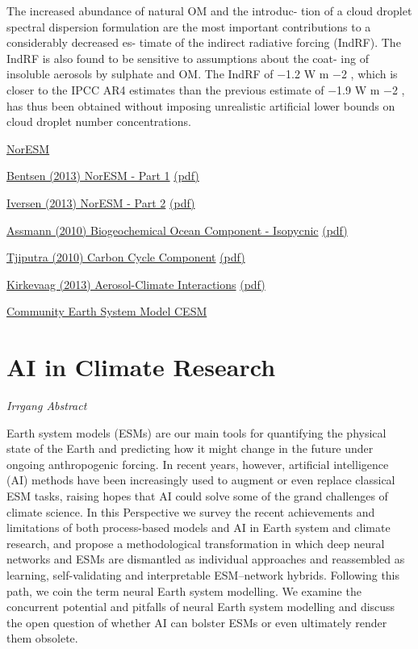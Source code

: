 \documentclass[
]{book}
\begin{document}
The increased abundance of natural OM and the introduc-
tion of a cloud droplet spectral dispersion formulation are the
most important contributions to a considerably decreased es-
timate of the indirect radiative forcing (IndRF). The IndRF
is also found to be sensitive to assumptions about the coat-
ing of insoluble aerosols by sulphate and OM. The IndRF of
−1.2 W m −2 , which is closer to the IPCC AR4 estimates than
the previous estimate of −1.9 W m −2 , has thus been obtained
without imposing unrealistic artificial lower bounds on cloud
droplet number concentrations.

\href{https://www.noresm.org/}{NorESM}

\href{https://gmd.copernicus.org/articles/6/687/2013/}{Bentsen (2013) NorESM - Part 1}
\href{pdf/Bentsen_2013_NorESM_1.pdf}{(pdf)}

\href{https://gmd.copernicus.org/articles/6/389/2013/}{Iversen (2013) NorESM - Part 2}
\href{pdf/Iversen_2013_NorESM_2.pdf}{(pdf)}

\href{https://gmd.copernicus.org/articles/3/143/2010/}{Assmann (2010) Biogeochemical Ocean Component - Isopycnic}
\href{pdf/Assmann_2010_Isopycnic_Ocean_Carbon_Cycle_Model.pdf}{(pdf)}

\href{https://gmd.copernicus.org/articles/3/123/2010/}{Tjiputra (2010) Carbon Cycle Component}
\href{pdf/Tjiputra_2010_Climate_Cycle_Feedbacks.pdf}{(pdf)}

\href{https://gmd.copernicus.org/articles/6/207/2013/}{Kirkevaag (2013) Aerosol-Climate Interactions}
\href{pdf/Kirkevaag_2013_Aerosol_NorESM.pdf}{(pdf)}

\href{https://www.cesm.ucar.edu/}{Community Earth System Model CESM}

\hypertarget{ai-in-climate-research}{%
\section{AI in Climate Research}\label{ai-in-climate-research}}

\emph{Irrgang Abstract}

Earth system models (ESMs) are our main tools for quantifying the physical state of the Earth and predicting how it might change in the future under ongoing anthropogenic forcing. In recent years, however, artificial intelligence (AI) methods have been increasingly used to augment or even replace classical ESM tasks, raising hopes that AI could solve some of the grand challenges of climate science. In this Perspective we survey the recent achievements and limitations of both process-based models and AI in Earth system and climate research, and propose a methodological transformation in which deep neural networks and ESMs are dismantled as individual approaches and reassembled as learning, self-validating and interpretable ESM--network hybrids. Following this path, we coin the term neural Earth system modelling. We examine the concurrent potential and pitfalls of neural Earth system modelling and discuss the open question of whether AI can bolster ESMs or even ultimately render them obsolete.
\end{document}
